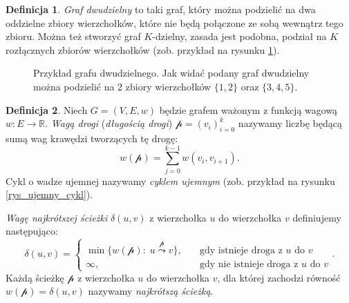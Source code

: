 \documentclass[12pt,a4paper]{book}
\theoremstyle{definition}
\newtheorem{de}{Definicja}[chapter]
\newcommand{\bR}{{\mathbb R}}
\newcommand{\p}{{\mathcal p}}
\numberwithin{equation}{chapter}
\begin{document}
\begin{de}
\textit{Graf dwudzielny} to taki graf, który można podzielić na dwa oddzielne zbiory wierzchołków, które nie będą połączone ze sobą wewnątrz tego zbioru. Można też stworzyć graf $K$-dzielny, zasada jest podobna, podział na $K$ rozłącznych zbiorów wierzchołków (zob. przykład na rysunku \ref{rys_graf_dwudzielny}).
\end{de}

\begin{figure}[!htp]
\centering
{}
\caption{Przykład grafu dwudzielnego.
Jak widać podany graf dwudzielny można podzielić na $2$ zbiory wierzchołków $\{1,2\}$ oraz $\{3,4,5\}$.}
\label{rys_graf_dwudzielny}
\end{figure}

\begin{de}
Niech $G = (V, E, w)$ będzie grafem ważonym z funkcją wagową  $w\colon E\to \bR$. \textit{Wagą drogi} (\textit{długością drogi}) $\p = (v_i)_{i=0}^{k}$ nazywamy liczbę będącą sumą wag krawędzi tworzących tę drogę:
$$
w(\p) = \sum_{j = 0}^{k-1}w(v_{i}, v_{i+1}).
$$
Cykl o wadze ujemnej nazywamy \textit{cyklem ujemnym} (zob. przykład na rysunku \ref{rys_ujemny_cykl}).

\noindent
\textit{Wagę najkrótszej ścieżki} $\delta(u, v)$ z wierzchołka $u$ do wierzchołka $v$ definiujemy następująco:
$$
\delta(u, v) = 
\left\{
\begin{array}{ll}
\min\{w(\p)\colon\; u\stackrel{\p}{\leadsto}v\},&\quad \mbox{gdy istnieje droga z $u$ do $v$}\\
\infty, & \quad \mbox{gdy nie istnieje droga z $u$ do $v$}
\end{array}
\right..
$$
Każdą ścieżkę $\p$ z wierzchołka $u$ do wierzchołka $v$, dla której zachodzi równość $w(\p) =\delta(u, v)$ nazywamy \textit{najkrótszą ścieżką}.
\end{de}
\end{document}
